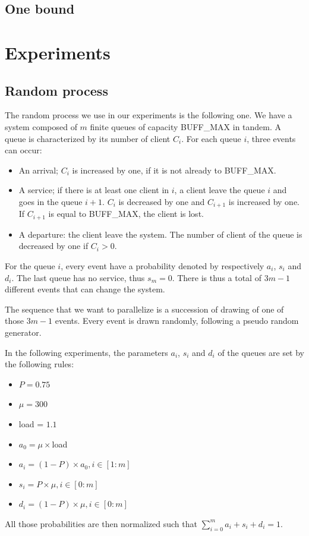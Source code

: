 \documentclass[a4paper,10pt]{article}
\begin{document}
\subsection{One bound}
\label{sec:onebound}

\section{Experiments}

\subsection{Random process}
\label{sec:randomproc}
The random process we use in our experiments is the following one. We have a system composed of $m$ finite queues of capacity BUFF\_MAX in tandem. A queue is characterized by its number of client $C_i$.  For each queue $i$, three events can occur:
\begin{itemize}
\item An arrival; $C_i$ is increased by one, if it is not already to BUFF\_MAX.
\item A service; if there is at least one client in $i$, a client leave the queue $i$ and goes in the queue $i+1$. $C_i$ is decreased by one and $C_{i+1}$ is increased by one. If $C_{i+1}$ is equal to BUFF\_MAX, the client is lost.
\item A departure: the client leave the system. The number of client of the queue is decreased by one if $C_i >0$.

\end{itemize}

For the queue $i$, every event have a probability denoted by respectively $a_i$, $s_i$ and $d_i$. The last queue has no service, thus $s_m = 0 $. There is thus a total of $3m-1$ different events that can change the system.


The sequence that we want to parallelize is a succession of drawing of one of those $3m-1$ events. Every event is drawn randomly, following a pseudo random generator. 

In the following experiments, the parameters $a_i$, $s_i$ and $d_i$ of the queues are set by the following rules:
\begin{itemize}
\item $P = 0.75$
\item $\mu = 300$
\item load = $1.1$
\item $a_0 = \mu \times $load
\item $a_i = (1-P) \times a_0, i \in [1:m]$
\item $s_i = P \times \mu, i \in [0:m]$
\item $d_i = (1-P) \times \mu, i \in [0:m]$
\end{itemize}
All those probabilities are then normalized such that $\sum\limits_{i=0}^m a_i + s_i + d_i = 1$.
\end{document}
